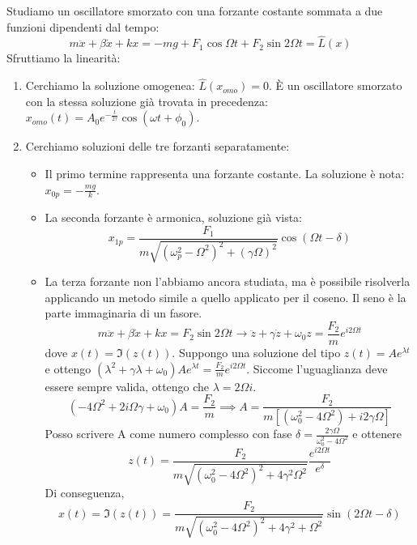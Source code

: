 Studiamo un oscillatore smorzato con una forzante costante sommata a due funzioni dipendenti dal tempo:
\[
	m \ddot{x} + \beta \dot{x} + kx = - mg + F_1 \cos \Omega t + F_2 \sin 2 \Omega t = \hat{L} (x)
\]
Sfruttiamo la linearità:
\begin{enumerate}
	
	\item Cerchiamo la soluzione omogenea: \(\hat{L} (x_{omo} ) = 0\). È un oscillatore smorzato con la stessa soluzione già trovata in precedenza: \(x_{omo} (t) = A_0 e^{-\frac{t}{2 \tau }}\cos (\omega t + \phi _0) \).
	\item Cerchiamo soluzioni delle tre forzanti separatamente:
	\begin{itemize}
		
		\item Il primo termine rappresenta una forzante costante. La soluzione è nota: \(x_{0p} = -\frac{mg}{k}\).
		\item La seconda forzante è armonica, soluzione già vista:
		\[
			x_{1p} = \frac{F_1}{m \sqrt{(\omega _p ^{2} - \Omega ^{2} )^{2} + (\gamma \Omega )^{2} } }\cos (\Omega t - \delta ) 
		\]
		
		\item La terza forzante non l'abbiamo ancora studiata, ma è possibile risolverla applicando un metodo simile a quello applicato per il coseno. Il seno è la parte immaginaria di un fasore.
		\[
			m\ddot{x} + \beta \dot{x}  + kx = F_2 \sin 2\Omega t \to \ddot{z} + \gamma \dot{z}  + \omega _0 z = \frac{F_2}{m} e^{i2\Omega t} 
		\]
		dove \(x(t) = \Im (z(t))\). Suppongo una soluzione del tipo \(z(t)=A e^{\lambda t}\) e ottengo \((\lambda ^{2} + \gamma \lambda +\omega _0) A e^{\lambda t}=\frac{F_2}{m} e^{i2\Omega t} \). Siccome l'uguaglianza deve essere sempre valida, ottengo che \(\lambda = 2\Omega i \).
		\[
			(-4\Omega ^{2} + 2i \Omega \gamma +\omega _0) A = \frac{F_2}{m} \implies  A = \frac{F_2}{m \left[(\omega _0 ^{2} -4\Omega ^{2}) + i2\gamma \Omega \right]}
		\]
		Posso scrivere A come numero complesso con fase \(\delta = \frac{2\gamma \Omega }{\omega _0^{2} -4\Omega ^{2} }\)  e ottenere
		\[
			z(t) = \frac{F_2}{m\sqrt{(\omega _0 ^{2} -4\Omega ^{2} )^{2} +4\gamma ^{2} \Omega ^{2} } }\frac{e^{i2\Omega t} }{e^{\delta }}
		\]
		Di conseguenza,
		\[
			x(t)= \Im (z(t))=\frac{F_2}{m\sqrt{(\omega _0^{2} -4\Omega ^{2} )^{2} + 4\gamma ^{2} +\Omega ^{2}  } }\sin (2\Omega t-\delta )
		\]
	\end{itemize}
\end{enumerate}

